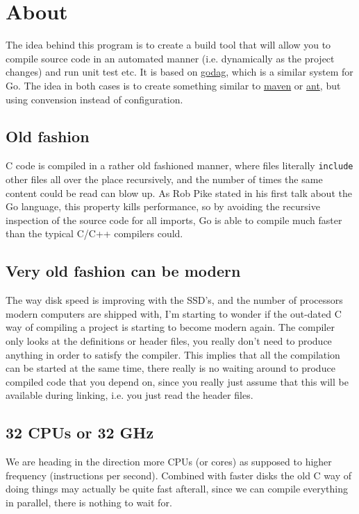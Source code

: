 
\section{ About }

The idea behind this program is to create a build tool that will allow
you to compile source code in an automated manner (i.e. dynamically
as the project changes) and run unit test etc. It is based on 
 \href{http://godag.googlecode.com}{godag}, which is a similar
system for Go. The idea in both cases is to create something similar
to  \href{https://maven.apache.org}{maven} or  \href{https://ant.apache.org}{ant},
but using convension instead of configuration.



\subsection{ Old fashion }

C code is compiled in a rather old fashioned manner, where 
files literally \texttt{include} other files all over the place recursively,
and the number of times the same content could be read can blow up.
As Rob Pike stated in his first talk about the Go language, this
property kills performance, so by avoiding the
recursive inspection of the source code for all imports, Go is
able to compile much faster than the typical C/C++ compilers could.



\subsection{ Very old fashion can be modern }

The way disk speed is improving with the SSD's, and the number of
processors modern computers are shipped with, I'm starting to wonder
if the out-dated C way of compiling a project is starting to become
modern again. The compiler only looks at the definitions or header
files, you really don't need to produce anything in order to satisfy
the compiler. This implies that all the compilation can
be started at the same time, there really is no waiting around 
to produce compiled code that you depend on, since you really just
assume that this will be available during linking, i.e. you just
read the header files.



\subsection{ 32 CPUs or 32 GHz }

We are heading in the direction more CPUs (or cores)
as supposed to higher frequency (instructions per second).
Combined with faster disks the old C way of doing things may 
actually be quite fast afterall, since we can compile 
everything in parallel, there is nothing to wait for.


